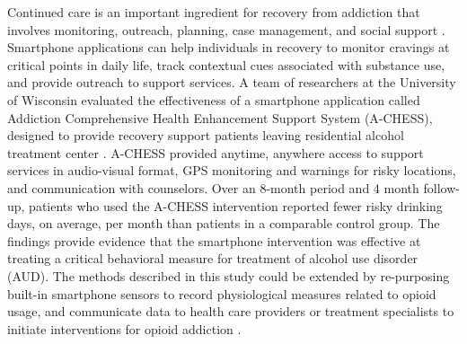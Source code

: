 \documentclass[sigconf]{acmart}
\begin{document}
Continued care is an important ingredient for recovery from addiction that
involves monitoring, outreach, planning, case management, and social support 
\cite{johnson11}. Smartphone applications can help individuals in recovery to 
monitor cravings at critical points in daily life, track contextual cues 
associated with substance use, and provide outreach to support services. A team 
of researchers at the University of Wisconsin evaluated the effectiveness of a
smartphone application called Addiction Comprehensive Health Enhancement Support 
System (A-CHESS), designed to provide recovery support patients leaving 
residential alcohol treatment center \cite{gustafson14}. A-CHESS provided anytime, 
anywhere access to support services in audio-visual format, GPS monitoring and 
warnings for risky locations, and communication with counselors. Over an 8-month
period and 4 month follow-up, patients who used the A-CHESS intervention reported
fewer risky drinking days, on average, per month than patients in a comparable
control group. The findings provide evidence that the smartphone intervention was 
effective at treating a critical behavioral measure for treatment of alcohol use 
disorder (AUD). The methods described in this study could be extended by 
re-purposing built-in smartphone sensors to record physiological measures 
related to opioid usage, and communicate data to health care providers or 
treatment specialists to initiate interventions for opioid addiction
\cite{johnson11}. 
\end{document}
